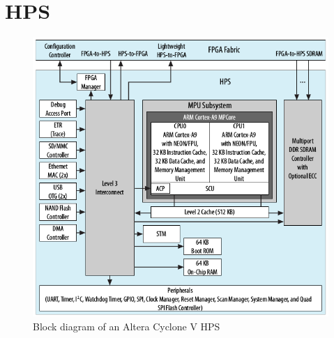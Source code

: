 \section{HPS}
\begin{figure}[htbp]
\begin{center}
\includegraphics[width=15cm,keepaspectratio=true]{bilder/png/AlteraHPSneu}
\caption{Block diagram of an Altera Cyclone V HPS\cite{altcycvov15}}
\label{fig:alterahpsblocks}
\end{center}
\end{figure}
